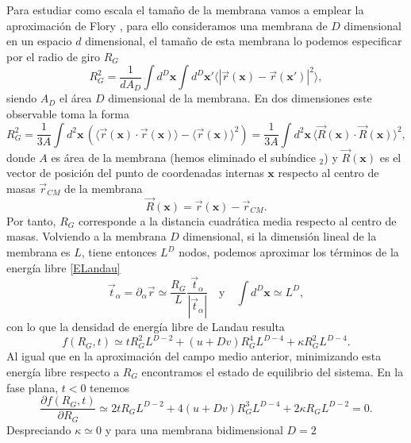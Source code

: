 Para estudiar como escala el tamaño de la membrana vamos a emplear la
aproximación de Flory \cite{Gennes:Scaling}, para ello consideramos una
membrana de $D$ dimensional en un espacio 
$d$ dimensional, el tamaño de esta membrana lo podemos especificar por el
radio de giro $R_G$
\begin{equation*}
R_G^2=\frac{1}{dA_D}\int d^D\mathbf{x}\int d^D\mathbf{x}' \langle |
\vec{r}(\mathbf{x})-\vec{r}(\mathbf{x}')|^2\rangle, 
\end{equation*}
siendo $A_D$ el área $D$ dimensional de la membrana. En dos dimensiones este
observable toma la forma
\begin{equation*}
R_G^2=\frac{1}{3A}\int d^2\mathbf{x}\, (\langle
\vec{r}(\mathbf{x})\cdot\vec{r}(\mathbf{x})\rangle-\langle
\vec{r}(\mathbf{x})\rangle^2)=\frac{1}{3A}\int d^2\mathbf{x}\, \langle
\vec{R}(\mathbf{x})\cdot\vec{R}(\mathbf{x})\rangle^2,
\end{equation*} 
donde $A$ es área de la membrana (hemos eliminado el subíndice $_2$) y
$\vec{R}(\mathbf{x})$ es el vector de posición del punto de coordenadas
internas $\mathbf{x}$ respecto al centro de masas $\vec{r}_{CM}$ de la
membrana
\begin{equation*}
\vec{R}(\mathbf{x})=\vec{r}(\mathbf{x})-\vec{r}_{CM}.
\end{equation*}
Por tanto, $R_G$ corresponde a la distancia cuadrática media respecto al
centro de masas. Volviendo a la membrana $D$ dimensional, si la dimensión
lineal de la membrana es $L$, tiene entonces $L^D$ nodos, podemos
aproximar los términos \cite{David:normal,Gomper:triangulated} de la energía libre \eqref{ELandau}  
\begin{equation*}
\vec{t}_{\alpha}=\partial_{\alpha} \vec{r}\simeq \frac{R_G}{L}
\frac{\vec{t}_{\alpha}}{|\vec{t}_{\alpha}|}\quad \text{y}\quad \int
d^D\mathbf{x}\simeq L^D,
\end{equation*}
con lo que la densidad de energía libre de Landau resulta
\begin{equation*}
f(R_G,t)\simeq t R_G^2 L^{D-2}+(u+Dv) R_G^4 L^{D-4}+\kappa R_G^2 L^{D-4}.
\end{equation*}
Al igual que en la aproximación del campo medio anterior, minimizando esta
energía libre respecto a $R_G$ encontramos el estado de equilibrio del sistema. En la fase
plana, $t<0$ tenemos
\begin{equation*}
\frac{\partial f(R_G,t)}{\partial R_G}\simeq 2t R_G L^{D-2}+4(u+Dv) R_G^3
L^{D-4}+2 \kappa R_G L^{D-2}=0.
\end{equation*}
Despreciando $\kappa\simeq 0$ y para una membrana bidimensional $D=2$

